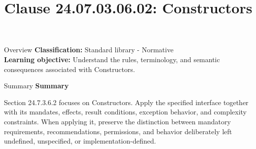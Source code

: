 \documentclass[10pt,letterpaper]{article}
\title{Clause 24.07.03.06.02: Constructors}
\author{}
\date{}
\begin{document}
\maketitle
\begin{CornellOverviewBox}{Overview}
\textbf{Classification:} Standard library - Normative\\[2pt]
\textbf{Learning objective:} Understand the rules, terminology, and semantic consequences associated with Constructors.
\end{CornellOverviewBox}\begin{CornellSummaryBox}{Summary}
{\sffamily\bfseries\color{Accent} Summary}\par\vspace{3pt}Section 24.7.3.6.2 focuses on Constructors. Apply the specified interface together with its mandates, effects, result conditions, exception behavior, and complexity constraints. When applying it, preserve the distinction between mandatory requirements, recommendations, permissions, and behavior deliberately left undefined, unspecified, or implementation-defined.
\end{CornellSummaryBox}
\end{document}
